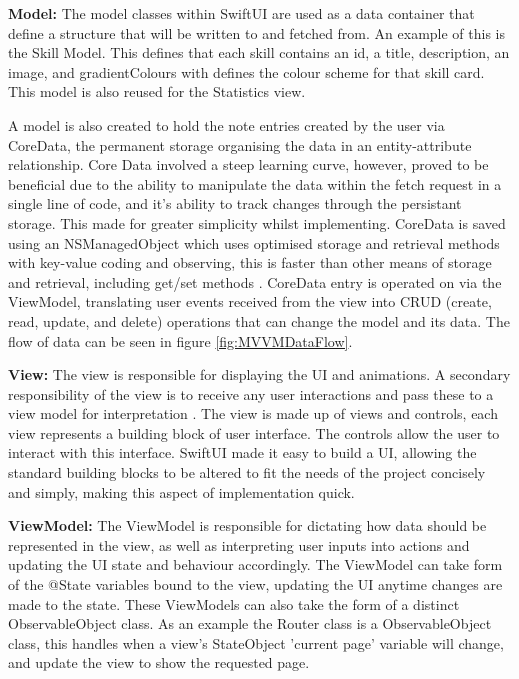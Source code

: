 \documentclass{l4proj}
\begin{document}
\textbf{Model:} The model classes within SwiftUI are used as a data container that define a structure that will be written to and fetched from. An example of this is the Skill Model. This defines that each skill contains an id, a title, description, an image, and gradientColours with defines the colour scheme for that skill card. This model is also reused for the Statistics view.

A model is also created to hold the note entries created by the user via CoreData, the permanent storage organising the data in an entity-attribute relationship. Core Data involved a steep learning curve, however, proved to be beneficial due to the ability to manipulate the data within the fetch request in a single line of code, and it's ability to track changes through the persistant storage. This made for greater simplicity whilst implementing. CoreData is saved using an NSManagedObject which uses optimised storage and retrieval methods with key-value coding and observing, this is faster than other means of storage and retrieval, including get/set methods \citep{apple_developer_documentation_core_2021}. CoreData entry is operated on via the ViewModel, translating user events received from the view into CRUD (create, read, update, and delete) operations that can change the model and its data. The flow of data can be seen in figure \ref{fig:MVVMDataFlow}. 

\textbf{View:} The view is responsible for displaying the UI and animations. A secondary responsibility of the view is to receive any user interactions and pass these to a view model for interpretation \citep{bulavin_modern_2020}. The view is made up of views and controls, each view represents a building block of user interface. The controls allow the user to interact with this interface. SwiftUI made it easy to build a UI, allowing the standard building blocks to be altered to fit the needs of the project concisely and simply, making this aspect of implementation quick.

\textbf{ViewModel:} The ViewModel is responsible for dictating how data should be represented in the view, as well as interpreting user inputs into actions and updating the UI state and behaviour accordingly. The ViewModel can take form of the @State variables bound to the view, updating the UI anytime changes are made to the state. These ViewModels can also take the form of a distinct ObservableObject class. As an example the Router class is a ObservableObject class, this handles when a view's StateObject 'current page' variable will change, and update the view to show the requested page. 
\end{document}
